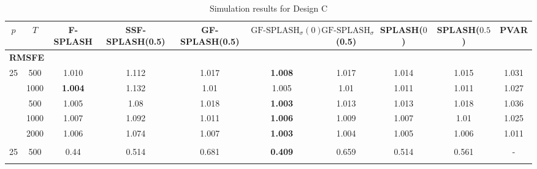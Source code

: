 \begin{landscape}
    \bgroup
    \def\arraystretch{1.3}
    \begin{table}[p]
    \footnotesize
    \centering
    \caption{Simulation results for Design C}
    \label{tab:results_designC}
    \begin{tabular}{cccccccccc}    
    \hline \hline
    $p$  &  $T$   &  F-SPLASH  &  SSF-SPLASH(0.5)  &  GF-SPLASH(0.5)  &  $\text{GF-SPLASH}_\sigma(0)$  &  $\text{GF-SPLASH}_\sigma$(0.5)  &  SPLASH($0$)  &  SPLASH($0.5$)  &  PVAR  \\
    \hline
    \multicolumn{10}{l}{\textbf{RMSFE}} \\
	\hline
	 25  & 500  & 1.010                 &                 1.112                 &                      1.017                       & \textbf{1.008}                                 &                      1.017                       &          1.014           &           1.015            &       1.031       \\ \hdashline
	 25  & 1000 & \textbf{1.004}        &                 1.132                 &                       1.01                       & 1.005                                          &                       1.01                       &          1.011           &           1.011            &       1.027       \\ \hdashline
	 36  & 500  & 1.005                 &                 1.08                  &                      1.018                       & \textbf{1.003}                                 &                      1.013                       &          1.013           &           1.018            &       1.036       \\ \hdashline
	 36  & 1000 & 1.007                 &                 1.092                 &                      1.011                       & \textbf{1.006}                                 &                      1.009                       &          1.007           &            1.01            &       1.025       \\ \hdashline
	 36  & 2000 & 1.006                 &                 1.074                 &                      1.007                       & \textbf{1.003}                                 &                      1.004                       &          1.005           &           1.006            &       1.011       \\ \hdashline
	\hline
	\multicolumn{10}{l}{$\mathbf{EE_A}$} \\
	\hline
	 25  & 500  &         0.44          &                 0.514                 &                      0.681                       & \textbf{0.409}                                 &                      0.659                       &          0.514           &           0.561            & -                 \\ \hdashline

\end{tabular}
\end{table}
\end{landscape}
